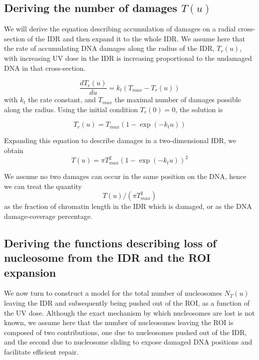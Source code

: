 \documentclass[12pt]{article}
\begin{document}
	\subsection{Deriving the number of damages $T(u)$}
	
	We will derive the equation describing accumulation of damages on a radial
	cross-section of the IDR and then expand it to the whole IDR. We assume
	here that the rate of accumulating DNA damages along the radius of the
	IDR, $T_r(u)$, with increasing UV dose in the IDR is increasing proportional
	to the undamaged DNA in that cross-section.
	
	\begin{equation*}
	\frac{dT_r(u)}{du} = k_t(T_{max} - T_r(u))
	\end{equation*}	
	with $k_t$ the rate constant, and $T_{max}$ the maximal number of damages possible
	along the radius. Using the initial condition $T_r(0) = 0$, the solution is
	
	\begin{equation*}
	T_r(u) = T_{max}(1-\exp(−k_tu))
	\end{equation*}
	
	Expanding this equation to describe damages in a two-dimensional IDR, we
	obtain
	\begin{equation}\label{eq:damagesIDR}
	T(u) = \pi T_{max}^2 (1-\exp(−k_tu))^2
	\end{equation}
	
	We assume no two damages can occur in the same position on the DNA,
	hence we can treat the quantity
	\begin{equation*}
	T(u)/(\pi T_{max}^2)
	\end{equation*}
	as the fraction of chromatin length in the IDR which is damaged, or as the
	DNA damage-coverage percentage.
	
	\subsection{Deriving the functions describing loss of nucleosome from the IDR and the ROI expansion}
	We now turn to construct a model for the total number of nucleosomes $N_T(u)$
	leaving the IDR and subsequently being pushed out of the ROI, as a function
	of the UV dose. Although the exact mechanism by which nucleosomes are
	lost is not known, we assume here that the number of nucleosomes leaving
	the ROI is composed of two contributions, one due to nucleosomes pushed
	out of the IDR, and the second due to nucleosome sliding to expose damaged
	DNA positions and facilitate efficient repair.
	
\end{document}
